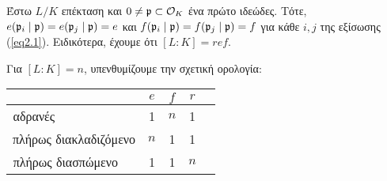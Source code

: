 
\begin{cor}
	Έστω $L/K$  επέκταση και $0 \neq \mathfrak{p} \subset \mathcal{O}_K$ ένα πρώτο ιδεώδες. Τότε, $e(\mathfrak{p}_i \mid \mathfrak{p}) = e(\mathfrak{p}_j \mid \mathfrak{p}) = e$ και $f(\mathfrak{p}_i \mid \mathfrak{p}) = f(\mathfrak{p}_j \mid \mathfrak{p})=f$ για κάθε $i,j$ της εξίσωσης (\ref{eq2.1}). Ειδικότερα, έχουμε ότι $[L:K] = ref$.
\end{cor}


\noindent Για $[L:K]=n$, υπενθυμίζουμε την σχετική ορολογία:
\begin{center}
\begin{tabular}{ |c|c|c|c|c| } 
	\hline
	 & $e$ & $f$ & $r$ \\
	\hline
	 αδρανές $\quad \quad \quad \quad \quad \quad$ & 1 & $n$ & 1\\ 
	 πλήρως διακλαδιζόμενο & $n$ & 1 & 1 \\ 
	 πλήρως διασπώμενο $\quad $& 1 & 1 & $n$ \\ 
	 \hline
	 \end{tabular}
	\end{center}

